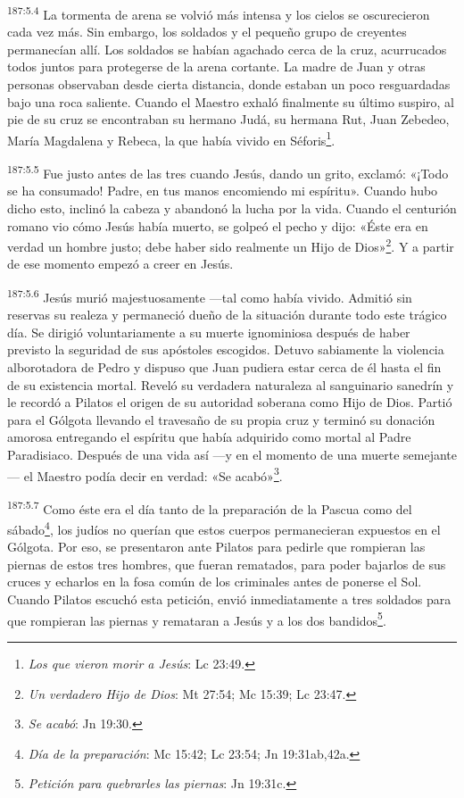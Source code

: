 \par
\textsuperscript{187:5.4} La tormenta de arena se volvió más intensa y los cielos se oscurecieron cada vez más. Sin embargo, los soldados y el pequeño grupo de creyentes permanecían allí. Los soldados se habían agachado cerca de la cruz, acurrucados todos juntos para protegerse de la arena cortante. La madre de Juan y otras personas observaban desde cierta distancia, donde estaban un poco resguardadas bajo una roca saliente. Cuando el Maestro exhaló finalmente su último suspiro, al pie de su cruz se encontraban su hermano Judá, su hermana Rut, Juan Zebedeo, María Magdalena y Rebeca, la que había vivido en Séforis\footnote{\textit{Los que vieron morir a Jesús}: Lc 23:49.}.

\par
\textsuperscript{187:5.5} Fue justo antes de las tres cuando Jesús, dando un grito, exclamó: «¡Todo se ha consumado! Padre, en tus manos encomiendo mi espíritu». Cuando hubo dicho esto, inclinó la cabeza y abandonó la lucha por la vida. Cuando el centurión romano vio cómo Jesús había muerto, se golpeó el pecho y dijo: «Éste era en verdad un hombre justo; debe haber sido realmente un Hijo de Dios»\footnote{\textit{Un verdadero Hijo de Dios}: Mt 27:54; Mc 15:39; Lc 23:47.}. Y a partir de ese momento empezó a creer en Jesús.

\par
\textsuperscript{187:5.6} Jesús murió majestuosamente ---tal como había vivido. Admitió sin reservas su realeza y permaneció dueño de la situación durante todo este trágico día. Se dirigió voluntariamente a su muerte ignominiosa después de haber previsto la seguridad de sus apóstoles escogidos. Detuvo sabiamente la violencia alborotadora de Pedro y dispuso que Juan pudiera estar cerca de él hasta el fin de su existencia mortal. Reveló su verdadera naturaleza al sanguinario sanedrín y le recordó a Pilatos el origen de su autoridad soberana como Hijo de Dios. Partió para el Gólgota llevando el travesaño de su propia cruz y terminó su donación amorosa entregando el espíritu que había adquirido como mortal al Padre Paradisiaco. Después de una vida así ---y en el momento de una muerte semejante--- el Maestro podía decir en verdad: «Se acabó»\footnote{\textit{Se acabó}: Jn 19:30.}.

\par
\textsuperscript{187:5.7} Como éste era el día tanto de la preparación de la Pascua como del sábado\footnote{\textit{Día de la preparación}: Mc 15:42; Lc 23:54; Jn 19:31ab,42a.}, los judíos no querían que estos cuerpos permanecieran expuestos en el Gólgota. Por eso, se presentaron ante Pilatos para pedirle que rompieran las piernas de estos tres hombres, que fueran rematados, para poder bajarlos de sus cruces y echarlos en la fosa común de los criminales antes de ponerse el Sol. Cuando Pilatos escuchó esta petición, envió inmediatamente a tres soldados para que rompieran las piernas y remataran a Jesús y a los dos bandidos\footnote{\textit{Petición para quebrarles las piernas}: Jn 19:31c.}.

